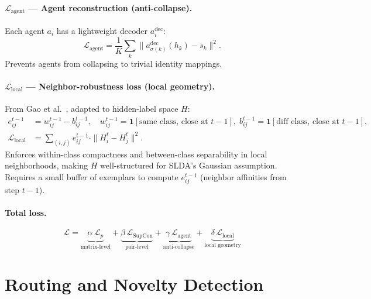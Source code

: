 \documentclass[11pt,a4paper]{article}
\newcommand{\Lcal}{\mathcal{L}}
\begin{document}
\paragraph{$\Lcal_{\mathrm{agent}}$ — Agent reconstruction (anti-collapse).}
Each agent $a_i$ has a lightweight decoder $a_i^{\mathrm{dec}}$:
\begin{equation}
  \Lcal_{\mathrm{agent}} = \frac{1}{K}\sum_k \|a^{\mathrm{dec}}_{\sigma(k)}(h_k) - s_k\|^2.
\end{equation}
Prevents agents from collapsing to trivial identity mappings.

\paragraph{$\Lcal_{\mathrm{local}}$ — Neighbor-robustness loss (local geometry).}
From Gao et al.~\cite{gao2023geometry}, adapted to hidden-label space $H$:
\begin{align}
  e^{t-1}_{ij} &= w^{t-1}_{ij} - b^{t-1}_{ij},
  \quad
  w^{t-1}_{ij} = \mathbf{1}[\text{same class, close at }t\!-\!1],\;
  b^{t-1}_{ij} = \mathbf{1}[\text{diff class, close at }t\!-\!1], \\
  \Lcal_{\mathrm{local}} &= \sum_{(i,j)} e^{t-1}_{ij}\cdot\|H_i^t - H_j^t\|^2.
\end{align}
Enforces within-class compactness and between-class separability in local neighborhoods,
making $H$ well-structured for SLDA's Gaussian assumption.
Requires a small buffer of exemplars to compute $e^{t-1}_{ij}$ (neighbor affinities from step $t-1$).

\paragraph{Total loss.}
\begin{equation}
\boxed{
  \Lcal = \underbrace{\alpha\,\Lcal_p}_{\text{matrix-level}} +
          \underbrace{\beta\,\Lcal_{\mathrm{SupCon}}}_{\text{pair-level}} +
          \underbrace{\gamma\,\Lcal_{\mathrm{agent}}}_{\text{anti-collapse}} +
          \underbrace{\delta\,\Lcal_{\mathrm{local}}}_{\text{local geometry}}
}
\end{equation}

\section{Routing and Novelty Detection}
\end{document}
